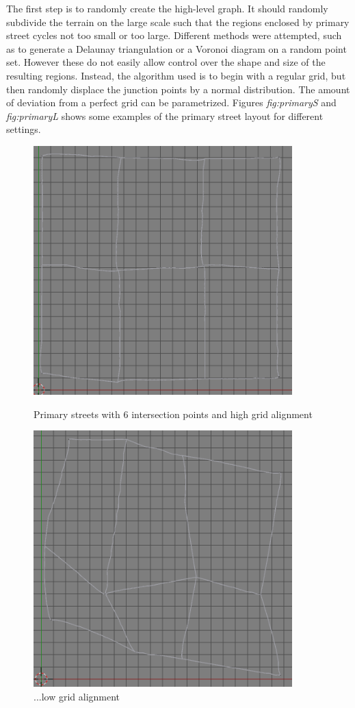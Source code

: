 \documentclass[a4paper,12pt]{scrartcl}
\begin{document}
The first step is to randomly create the high-level graph. It should randomly subdivide the terrain on the large scale such that the regions enclosed by primary street cycles not too small or too large. Different methods were attempted, such as to generate a Delaunay triangulation or a Voronoi diagram on a random point set. However these do not easily allow control over the shape and size of the resulting regions. Instead, the algorithm used is to begin with a regular grid, but then randomly displace the junction points by a normal distribution. The amount of deviation from a perfect grid can be parametrized. Figures \emph{fig:primaryS} and \emph{fig:primaryL} shows some examples of the primary street layout for different settings.

\begin{figure}[h]
\center
\includegraphics[width=10cm]{devS.png}
\caption{Primary streets with 6 intersection points and high grid alignment}
\label{fig:primaryS}
\includegraphics[width=10cm]{devL.png}
\caption{...low grid alignment}
\label{fig:primaryL}
\end{figure}
\end{document}
